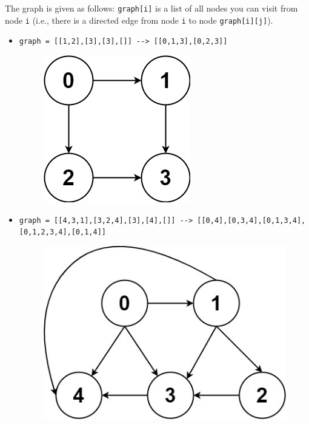 The graph is given as follows: {\colorbox{CodeBackground}{\lstinline|graph[i]|}} is a list of all nodes you can visit from node {\colorbox{CodeBackground}{\lstinline|i|}} (i.e., there is a directed edge from node {\colorbox{CodeBackground}{\lstinline|i|}} to node {\colorbox{CodeBackground}{\lstinline|graph[i][j]|}}).

\begin{itemize}
\item {\colorbox{CodeBackground}{\lstinline|graph = [[1,2],[3],[3],[]] --> [[0,1,3],[0,2,3]]|}}
\begin{figure}[H]
\centering
\includegraphics[width=0.15\linewidth]{images/lc0797_eg1}
\end{figure}
\item {\colorbox{CodeBackground}{\lstinline|graph = [[4,3,1],[3,2,4],[3],[4],[]] --> [[0,4],[0,3,4],[0,1,3,4],[0,1,2,3,4],[0,1,4]]|}}
\begin{figure}[H]
\centering
\includegraphics[width=0.28\linewidth]{images/lc0797_eg2}
\end{figure}
\end{itemize}